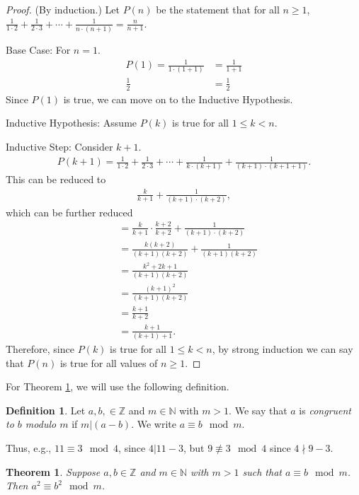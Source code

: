 \documentclass[11pt,titlepage]{article}		%
\def\Z{{\mathbb Z}}
\def\N{{\mathbb N}}
\theoremstyle{theorem}
\newtheorem{theorem}{Theorem}
\begin{document}
\begin{proof}
(By induction.)
Let $P(n)$ be the statement that for all $n \ge 1$, $\frac{1}{1\cdot 2} + \frac{1}{2\cdot 3} + \cdots + \frac{1}{n\cdot(n+1)} = \frac{n}{n+1}$. 

Base Case: For $n = 1$.
\begin{align*}
P(1) = \frac{1}{1 \cdot (1+1)} &= \frac{1}{1+1}\\
\frac{1}{2} &= \frac{1}{2}
\end{align*}
Since $P(1)$ is true, we can move on to the Inductive Hypothesis.

Inductive Hypothesis: Assume $P(k)$ is true for all $1 \le k < n$.

Inductive Step: Consider $k+1$.
\begin{align*}
P(k+1) = \frac{1}{1\cdot 2} + \frac{1}{2\cdot 3} + \cdots + \frac{1}{k\cdot(k+1)} + \frac{1}{(k+1) \cdot (k+1+1)}.
\end{align*}
This can be reduced to
\begin{align*}
\frac{k}{k+1} + \frac{1}{(k+1) \cdot (k+2)},
\end{align*}
which can be further reduced
\begin{align*}
&=\frac{k}{k+1}\cdot \frac{k+2}{k+2} + \frac{1}{(k+1) \cdot (k+2)}\\
&=\frac{k(k+2)}{(k+1)(k+2)} + \frac{1}{(k+1)(k+2)}\\
&=\frac{k^2+2k+1}{(k+1)(k+2)}\\
&=\frac{(k+1)^2}{(k+1)(k+2)}\\
&=\frac{k+1}{k+2}\\
& = \frac{k+1}{(k+1)+1}.
\end{align*}
Therefore, since $P(k)$ is true for all $1 \le k < n$, by strong induction we can say that $P(n)$ is true for all values of $n \ge 1$.
\end{proof}
\clearpage

For Theorem \ref{thm:modular-squares}, we will use the following definition.

\theoremstyle{definition}
\newtheorem{definition}{Definition}
\begin{definition}
    Let $a,b,\in\Z$ and $m\in \N$ with $m > 1$.
    We say that $a$ is \emph{congruent to $b$ modulo $m$} if $m|(a-b)$.
    We write $a \equiv b\mod m$.
\end{definition}

Thus, e.g., $11\equiv 3\mod 4$, since $4|11-3$, but $9\not\equiv 3\mod 4$ since $4\nmid 9-3$.

\begin{theorem}\label{thm:modular-squares}
    Suppose $a,b\in \Z$ and $m\in \N$ with $m > 1$ such that $a\equiv b\mod m$.
    Then $a^2 \equiv b^2\mod m$.
\end{theorem}
\end{document}
